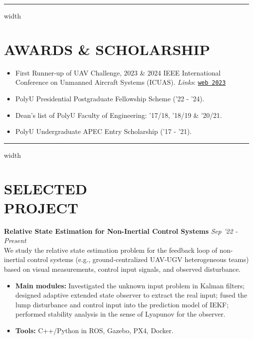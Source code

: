 \documentclass[overlapped]{res}
\newcommand{\pink}[1]{\textcolor{pink!40!red}{#1}} %
\begin{document}
\begin{resume}
\par\noindent\hrule width \linewidth %
\section{AWARDS \& SCHOLARSHIP}
\begin{itemize}
  \item First Runner-up of UAV Challenge, 2023 \& 2024 IEEE International Conference on Unmanned Aircraft Systems (ICUAS). \textit{Links}: \pink{
    \texttt{\href{https://www.polyu.edu.hk/publications/pulse-polyu/issue/202308/achievements/aae-team-wins-first-runner-up-prize-at-icuas-23-uav-competition}{web 2023}}
  } 
  \item PolyU Presidential Postgraduate Fellowship Scheme ('22 - '24).
  \item Dean’s list of PolyU Faculty of Engineering: '17/18, '18/19 \& '20/21.
  \item PolyU Undergraduate APEC Entry Scholarship ('17 - '21).
\end{itemize}
\par\noindent\hrule width \linewidth %

\section{SELECTED\\PROJECT}

\textbf{Relative State Estimation for Non-Inertial Control Systems}  
\hfill \textit{Sep '22 - Present} \\
We study the relative state estimation problem for the feedback loop of non-inertial control systems (e.g., ground-centralized UAV-UGV heterogeneous teams) based on visual measurements, control input signals, and observed disturbance. 

\begin{itemize}
  \item \textbf{Main modules:} Investigated the unknown input problem in Kalman filters; designed adaptive extended state observer to extract the real input; fused the lump disturbance and control input into the prediction model of IEKF; performed stability analysis in the sense of Lyapunov for the observer.
  \item \textbf{Tools:} C++/Python in ROS, Gazebo, PX4, Docker.
\end{itemize}


\end{resume}
\end{document}
